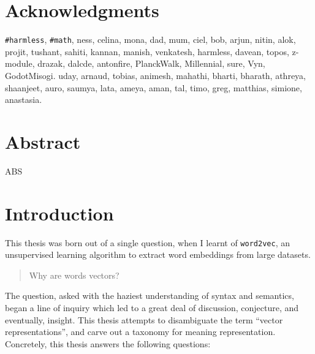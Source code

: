 \documentclass[11pt]{book}
\renewcommand{\baselinestretch}{1.2}
\begin{document}



\newpage
\thispagestyle{empty}
\renewcommand{\thesisdedication}{{\large Copyright \copyright~~NAME, YEAR\\}{\large All Rights Reserved\\}}
\thesisdedicationpage



\newpage
\thispagestyle{empty}
\renewcommand{\thesisdedication}{\large To \texttt{\#math} \&\texttt{\#harmless}}
\thesisdedicationpage

\mastersthesis
\renewcommand{\baselinestretch}{1.5}

\chapter*{Acknowledgments}
\label{ch:ack}
\texttt{\#harmless}, \texttt{\#math}, ness, celina, mona, dad, mum, ciel, bob,
arjun, nitin, alok, projit, tushant, sahiti, kannan, manish, venkatesh, 
harmless, davean, topos, z-module, drazak, dalcde, antonfire, PlanckWalk, Millennial, sure,
Vyn, GodotMisogi. uday, arnaud, tobias, animesh, mahathi, bharti, bharath, athreya, shaanjeet, auro, saumya, lata, ameya, aman, tal, timo, greg, matthias, simione, anastasia.


\chapter*{Abstract}
\label{ch:abstract}
ABS

\tableofcontents
\listoffigures
\listoftables

\chapter{Introduction}

This thesis was born out of a single question, when I learnt of \texttt{word2vec}, an unsupervised learning algorithm to extract word embeddings from large datasets.

\begin{quote}
Why are words vectors?
\end{quote}

The question, asked with the haziest understanding of syntax and semantics,
began a line of inquiry which led to a great deal of discussion, 
conjecture, and eventually, insight. This thesis attempts to 
disambiguate the term ``vector representations'', and carve out a taxonomy
for meaning representation. Concretely, this thesis answers
the following questions:
\end{document}
